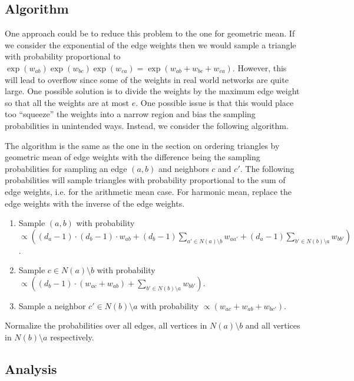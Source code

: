 \documentclass{article}
\begin{document}

\subsection{Algorithm}

One approach could be to reduce this problem to the one for 
geometric mean. If we consider the exponential of the edge weights
then we would sample a triangle with probability proportional to
$\exp(w_{ab}) \exp(w_{bc}) \exp(w_{ca}) = \exp(w_{ab} + w_{bc} +
w_{ca})$. However, this will lead to overflow since some of the
weights in real world networks are quite large. One possible
solution is to divide the weights by the maximum edge weight so
that all the weights are at most $e$. One possible issue is that
this would place too ``squeeze'' the weights into a narrow
region and bias the sampling probabilities in unintended ways.
Instead, we consider the following algorithm.

The algorithm is the same as the one in the section
on ordering triangles by geometric mean of edge weights
with the difference being the sampling probabilities
for sampling an edge $(a,b)$ and neighbors $c$ and $c'$.
The following probabilities will sample triangles with
probability proportional to the sum of edge weights, i.e.
for the arithmetic mean case. For harmonic mean, replace the
edge weights with the inverse of the edge weights.
\begin{enumerate}
\item Sample $(a,b)$ with probability $\propto \left((d_a-1)\cdot 
(d_b-1) \cdot w_{ab} + (d_b-1) \sum\limits_{a'\in N(a) \setminus b} 
w_{aa'} + (d_a-1) \sum\limits_{b' \in N(b)\setminus a} w_{bb'}\right)$. 
\item Sample $c \in N(a) \setminus b$ with probability 
$\propto \left((d_b-1) \cdot (w_{ac} + w_{ab}) + \sum\limits_{b' \in N(b)\setminus a}
w_{bb'}\right)$. 
\item Sample a neighbor $c' \in N(b) \setminus a$ with probability 
$\propto \left(w_{ac} + w_{ab} + w_{bc'}\right)$.  
\end{enumerate}
Normalize the probabilities over all edges, all vertices in
$N(a) \setminus b$ and all vertices in $N(b) \setminus a$
respectively.


\subsection{Analysis}
\end{document}
